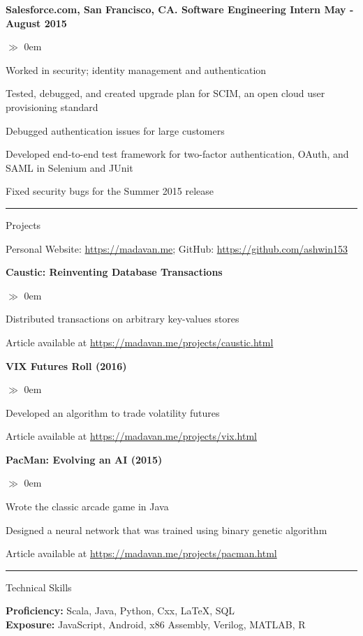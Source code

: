 \documentclass{article}
\begin{document}
\noindent\textbf{Salesforce.com, San Francisco, CA. Software Engineering Intern
\hfill{May - August 2015}}
\begin{list}{$\gg$}{}  
  \itemsep0em
  \item Worked in security; identity management and authentication
  \item Tested, debugged, and created upgrade plan for SCIM, an open cloud user provisioning standard
  \item Debugged authentication issues for large customers
  \item Developed end-to-end test framework for two-factor authentication,
  OAuth, and SAML in Selenium and JUnit
  \item Fixed security bugs for the Summer 2015 release
\end{list}

\hrule\medskip
\centerline{\large \sc Projects}\smallskip 
\centerline{Personal Website: \url{https://madavan.me}; GitHub:
\url{https://github.com/ashwin153}}\medskip

\noindent\textbf{Caustic: Reinventing Database Transactions}
\begin{list}{$\gg$}{}
  \itemsep0em
  \item Distributed transactions on arbitrary key-values stores
  \item Article available at \url{https://madavan.me/projects/caustic.html}
\end{list}

\noindent\textbf{VIX Futures Roll (2016)}
\begin{list}{$\gg$}{}
  \itemsep0em
  \item Developed an algorithm to trade volatility futures
  \item Article available at \url{https://madavan.me/projects/vix.html}
\end{list}

\noindent\textbf{PacMan: Evolving an AI (2015)}
\begin{list}{$\gg$}{}  
  	\itemsep0em
	\item Wrote the classic arcade game in Java
	\item Designed a neural network that was trained using binary genetic algorithm
	\item Article available at \url{https://madavan.me/projects/pacman.html}
\end{list}

\hrule\medskip
\centerline{\large \sc Technical Skills}\smallskip
\noindent\textbf{Proficiency:} Scala, Java, Python, Cxx, \LaTeX, SQL \\
\noindent\textbf{Exposure:} JavaScript, Android, x86 Assembly, Verilog, MATLAB, R \\
\end{document}
